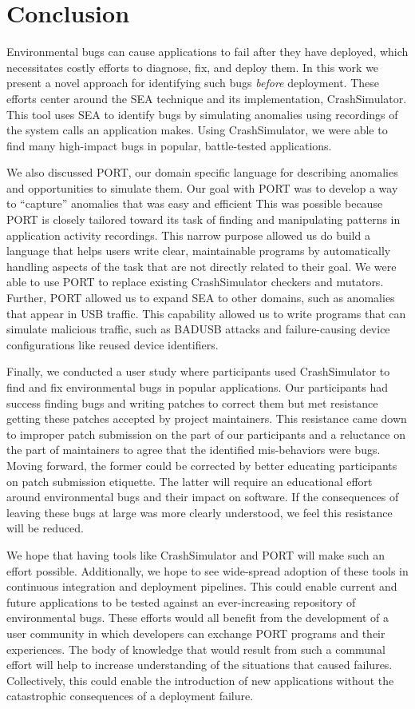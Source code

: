 \chapter{Conclusion}
\label{chap:conclusion}

Environmental bugs can cause applications to fail after they have deployed, which necessitates costly efforts to diagnose,
fix,
and deploy them.
In this work we present a novel approach for identifying such bugs \textit{before} deployment.
These efforts center around the SEA technique and its implementation,
CrashSimulator.
This tool uses SEA to identify bugs by simulating anomalies using recordings of the system calls an application makes.
Using CrashSimulator,
we were able to find many high-impact bugs in popular, battle-tested applications.

We also discussed PORT,
our domain specific language for describing anomalies and opportunities to simulate them.
Our goal with PORT was to develop a way to ``capture'' anomalies that was easy and efficient
This was possible because PORT is closely tailored toward its task of
finding and manipulating patterns in application activity recordings.
This narrow purpose allowed us do build a language that
helps users write clear,
maintainable programs
by automatically handling
aspects of the task that are not directly related to their goal.
We were able to use PORT to replace existing CrashSimulator checkers and mutators.
Further, PORT allowed us to expand SEA to other domains, such as anomalies that appear in USB traffic.
This capability allowed us to write programs that can simulate malicious traffic, such as BADUSB attacks
and failure-causing device configurations like reused device identifiers.

Finally,
we conducted a user study where participants used CrashSimulator to find and fix environmental bugs in popular applications.
Our participants had success finding bugs and writing patches to correct them but met resistance getting these patches accepted by project maintainers.
This resistance came down to improper patch submission on the part of our participants and a reluctance on the part of maintainers to agree that the identified mis-behaviors were bugs.
Moving forward, the former could be corrected by better educating participants on patch submission etiquette. The latter will require an educational effort around environmental bugs and their impact on software. If the consequences of leaving these bugs at large was more clearly understood, we feel this resistance will be reduced.

We hope that having tools like CrashSimulator and PORT will make such an effort possible.
Additionally, 
we hope to see wide-spread adoption of these
tools in continuous
integration and deployment pipelines. This could enable current and future
applications to be tested against an ever-increasing repository of
environmental bugs.
These efforts would all benefit from the development of a user community in which developers can exchange PORT programs and their experiences. The body of knowledge that would result from such a communal effort will help to increase understanding of the situations that caused failures.  Collectively, 
this could enable the introduction of new applications without the catastrophic consequences of a deployment failure. 